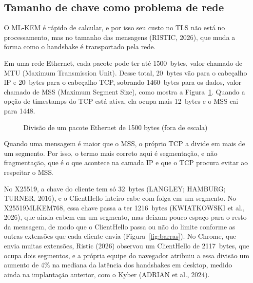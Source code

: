 \documentclass[12pt,a4paper]{article}
\newcommand{\fonte}[1]{\par\vspace{4pt}{\small Fonte: #1}}
\begin{document}
\subsection{Tamanho de chave como problema de rede}
\label{sec:rede}

O ML-KEM é rápido de calcular, e por isso seu custo no TLS não está no
processamento, mas no tamanho das mensagens (RISTIC, 2026), que muda a
forma como o handshake é transportado pela rede.



Em uma rede Ethernet, cada pacote pode ter até 1500~bytes, valor chamado de
MTU (Maximum Transmission Unit). Desse total, 20~bytes vão para o
cabeçalho IP e 20~bytes para o cabeçalho TCP, sobrando 1460~bytes para os
dados, valor chamado de MSS (Maximum Segment Size), como mostra a
Figura~\ref{fig:encaps}. Quando a opção de timestamps do TCP está
ativa, ela ocupa mais 12~bytes e o MSS cai para 1448.

\begin{figure}[H]
\centering
\caption{Divisão de um pacote Ethernet de 1500 bytes (fora de escala)}
\label{fig:encaps}
\fonte{Elaborado pelos autores.}
\end{figure}

Quando uma mensagem é maior que o MSS, o próprio TCP a divide em mais de um
segmento. Por isso, o termo mais correto aqui é segmentação, e não
fragmentação, que é o que acontece na camada IP e que o TCP
procura evitar ao respeitar o MSS.



No X25519, a chave do cliente tem só 32~bytes (LANGLEY; HAMBURG; TURNER,
2016), e o ClientHello inteiro cabe com folga em um segmento. No
X25519MLKEM768, essa chave passa a ter 1216~bytes (KWIATKOWSKI et al.,
2026), que ainda cabem em um segmento, mas deixam pouco espaço para o resto
da mensagem, de modo que o ClientHello passa ou não do limite conforme as
outras extensões que cada cliente envia (Figura~\ref{fig:barras}). No
Chrome, que envia muitas extensões, Ristic (2026) observou um ClientHello
de 2117~bytes, que ocupa dois segmentos, e a própria equipe do navegador
atribuiu a essa divisão um aumento de 4\% na mediana da latência dos
handshakes em desktop, medido ainda na implantação anterior, com o Kyber
(ADRIAN et al., 2024).
\end{document}
